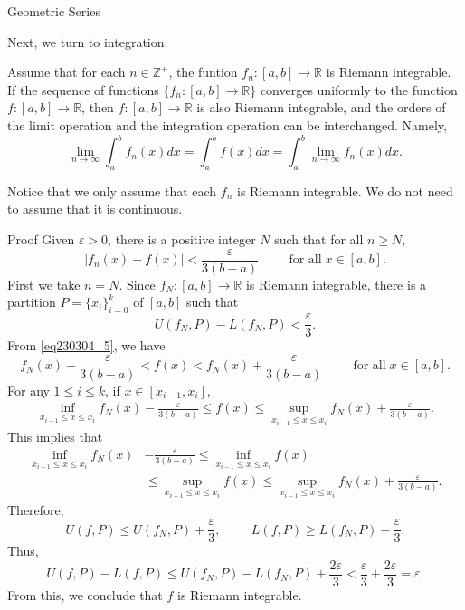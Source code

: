 \begin{example}[label=230305_16]{Geometric Series}
\begin{example}[label=230304_9]{}
Next, we turn to integration.
\begin{theorem}[label=230304_2]{}
 Assume that for  each $n\in\mathbb{Z}^+$, the funtion $f_n:[a,b]\to\mathbb{R}$ is Riemann integrable. If the sequence of functions $\{f_n:[a,b]\to\mathbb{R}\}$   converges uniformly to the function $f:[a,b]\to\mathbb{R}$, then $f:[a,b]\to\mathbb{R}$ is also Riemann integrable, and the orders of the limit operation and the integration operation can be interchanged. Namely,
\begin{equation}\label{eq230304_3}
\lim_{n\to\infty}\int_a^b f_n(x)dx=\int_a^bf(x)dx=\int_a^b\lim_{n\to\infty}f_n(x)dx.
\end{equation}
\end{theorem}
Notice that we only assume that each $f_n$ is Riemann integrable. We do not need to assume that it is continuous.
\begin{myproof}{Proof}
Given $\varepsilon>0$, there is a positive integer $N$ such that for all $n\geq N$, 
\begin{equation}\label{eq230304_5}|f_n(x)-f(x)|<\frac{\varepsilon}{3(b-a)}\hspace{1cm}\text{for all}\;x\in [a,b].\end{equation} First we take $n=N$. Since $f_N:[a,b]\to\mathbb{R}$ is Riemann integrable, there is a partition  $P=\{x_i\}_{i=0}^k$  of $[a,b]$ such that
\[U(f_N,P)-L(f_N,P)<\frac{\varepsilon}{3}.\]From \eqref{eq230304_5}, we have
\[f_N(x)-\frac{\varepsilon}{3(b-a)}<f(x)<f_N(x)+\frac{\varepsilon}{3(b-a)}\hspace{1cm}\text{for all}\;x\in [a,b].\]
  For any $1\leq i\leq k$, if $x\in [x_{i-1}, x_i]$,
\begin{align*}
\inf_{x_{i-1}\leq x\leq x_i}f_N(x)-\frac{\varepsilon}{3(b-a)}\leq f(x)\leq \sup_{x_{i-1}\leq x\leq x_i}f_N(x)+\frac{\varepsilon}{3(b-a)}.
\end{align*}This implies that
\begin{align*}\inf_{x_{i-1}\leq x\leq x_i}f_N(x)&-\frac{\varepsilon}{3(b-a)} \leq \inf_{x_{i-1}\leq x\leq x_i}f(x)\\ &\leq  \sup_{x_{i-1}\leq x\leq x_i}f(x)\leq \sup_{x_{i-1}\leq x\leq x_i}f_N(x)+\frac{\varepsilon}{3(b-a)}.\end{align*}
 \bp
Therefore,
\[U(f,P)\leq U(f_N,P)+\frac{\varepsilon}{3},\hspace{1cm}L(f,P)\geq L(f_N,P)-\frac{\varepsilon}{3}.\] 
Thus,
\[U(f,P)-L(f,P)\leq U(f_N,P)-L(f_N,P)+\frac{2\varepsilon}{3}<\frac{\varepsilon}{3}+\frac{2\varepsilon}{3}=\varepsilon.\]
From this, we conclude  that $f$ is Riemann integrable.

\end{myproof}
\end{example}
\end{example}
